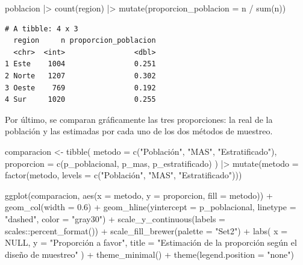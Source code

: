 \documentclass[
  spanish,
  a4paper,
]{scrreport}
\newenvironment{Shaded}{\begin{snugshade}}{\end{snugshade}}
\newcommand{\AttributeTok}[1]{\textcolor[rgb]{0.40,0.45,0.13}{#1}}
\newcommand{\ConstantTok}[1]{\textcolor[rgb]{0.56,0.35,0.01}{#1}}
\newcommand{\FloatTok}[1]{\textcolor[rgb]{0.68,0.00,0.00}{#1}}
\newcommand{\FunctionTok}[1]{\textcolor[rgb]{0.28,0.35,0.67}{#1}}
\newcommand{\NormalTok}[1]{\textcolor[rgb]{0.00,0.23,0.31}{#1}}
\newcommand{\OtherTok}[1]{\textcolor[rgb]{0.00,0.23,0.31}{#1}}
\newcommand{\SpecialCharTok}[1]{\textcolor[rgb]{0.37,0.37,0.37}{#1}}
\newcommand{\StringTok}[1]{\textcolor[rgb]{0.13,0.47,0.30}{#1}}
\newcounter{none} %
\theoremstyle{definition}
\theoremstyle{definition}
\theoremstyle{remark}
\begin{document}
\begin{Shaded}
\begin{Highlighting}[]
\NormalTok{poblacion }\SpecialCharTok{|\textgreater{}}
  \FunctionTok{count}\NormalTok{(region) }\SpecialCharTok{|\textgreater{}}
  \FunctionTok{mutate}\NormalTok{(}\AttributeTok{proporcion\_poblacion =}\NormalTok{ n }\SpecialCharTok{/} \FunctionTok{sum}\NormalTok{(n))}
\end{Highlighting}
\end{Shaded}

\begin{verbatim}
# A tibble: 4 x 3
  region     n proporcion_poblacion
  <chr>  <int>                <dbl>
1 Este    1004                0.251
2 Norte   1207                0.302
3 Oeste    769                0.192
4 Sur     1020                0.255
\end{verbatim}

Por último, se comparan gráficamente las tres proporciones: la real de
la población y las estimadas por cada uno de los dos métodos de
muestreo.

\begin{Shaded}
\begin{Highlighting}[]
\NormalTok{comparacion }\OtherTok{\textless{}{-}} \FunctionTok{tibble}\NormalTok{(}
  \AttributeTok{metodo =} \FunctionTok{c}\NormalTok{(}\StringTok{"Población"}\NormalTok{, }\StringTok{"MAS"}\NormalTok{, }\StringTok{"Estratificado"}\NormalTok{),}
  \AttributeTok{proporcion =} \FunctionTok{c}\NormalTok{(p\_poblacional, p\_mas, p\_estratificado)}
\NormalTok{) }\SpecialCharTok{|\textgreater{}}
  \FunctionTok{mutate}\NormalTok{(}\AttributeTok{metodo =} \FunctionTok{factor}\NormalTok{(metodo, }\AttributeTok{levels =} \FunctionTok{c}\NormalTok{(}\StringTok{"Población"}\NormalTok{, }\StringTok{"MAS"}\NormalTok{, }\StringTok{"Estratificado"}\NormalTok{)))}

\FunctionTok{ggplot}\NormalTok{(comparacion, }\FunctionTok{aes}\NormalTok{(}\AttributeTok{x =}\NormalTok{ metodo, }\AttributeTok{y =}\NormalTok{ proporcion, }\AttributeTok{fill =}\NormalTok{ metodo)) }\SpecialCharTok{+}
  \FunctionTok{geom\_col}\NormalTok{(}\AttributeTok{width =} \FloatTok{0.6}\NormalTok{) }\SpecialCharTok{+}
  \FunctionTok{geom\_hline}\NormalTok{(}\AttributeTok{yintercept =}\NormalTok{ p\_poblacional, }\AttributeTok{linetype =} \StringTok{"dashed"}\NormalTok{, }\AttributeTok{color =} \StringTok{"gray30"}\NormalTok{) }\SpecialCharTok{+}
  \FunctionTok{scale\_y\_continuous}\NormalTok{(}\AttributeTok{labels =}\NormalTok{ scales}\SpecialCharTok{::}\FunctionTok{percent\_format}\NormalTok{()) }\SpecialCharTok{+}
  \FunctionTok{scale\_fill\_brewer}\NormalTok{(}\AttributeTok{palette =} \StringTok{"Set2"}\NormalTok{) }\SpecialCharTok{+}
  \FunctionTok{labs}\NormalTok{(}
    \AttributeTok{x =} \ConstantTok{NULL}\NormalTok{,}
    \AttributeTok{y =} \StringTok{"Proporción a favor"}\NormalTok{,}
    \AttributeTok{title =} \StringTok{"Estimación de la proporción según el diseño de muestreo"}
\NormalTok{  ) }\SpecialCharTok{+}
  \FunctionTok{theme\_minimal}\NormalTok{() }\SpecialCharTok{+}
  \FunctionTok{theme}\NormalTok{(}\AttributeTok{legend.position =} \StringTok{"none"}\NormalTok{)}
\end{Highlighting}
\end{Shaded}
\end{document}
